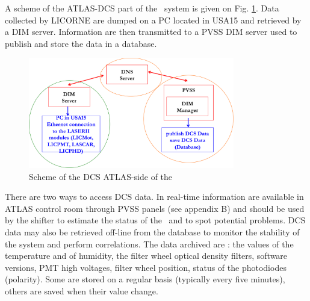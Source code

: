 A scheme of the ATLAS-DCS part of the \las~system is given on Fig. \ref{fig:lasdcs}. Data collected by LICORNE are dumped on a PC located in USA15 and retrieved by a DIM server. Information are then transmitted to a PVSS DIM server used to publish and store the data in a database.

\begin{figure}[htbp]
\centering
\includegraphics[width=9cm]{figures/dcs_scheme.png}
\caption{Scheme of the DCS ATLAS-side of the \las}\label{fig:lasdcs}
\end{figure}

There are two ways to access DCS data. In real-time information are available in ATLAS control room through PVSS panels (see appendix B) and should be used by the shifter to estimate the status of the \laser~and to spot potential problems. DCS data may also be retrieved off-line from the database to monitor the stability of the system and perform correlations. The data archived are : the values of the temperature and of humidity, the filter wheel optical density filters, software versions, PMT high voltages, filter wheel position, status of the photodiodes (polarity). Some are stored on a regular basis (typically every five minutes), others are saved when their value change. 